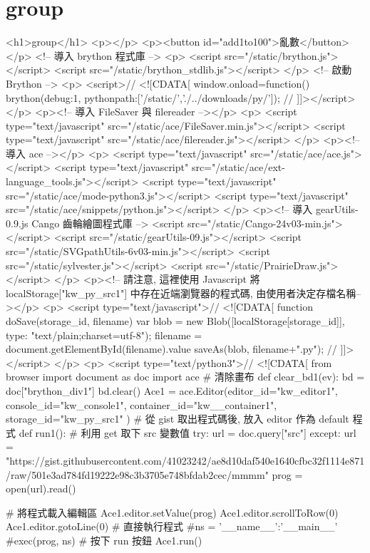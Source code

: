 \chapter{group}
<h1>group</h1>
<p></p>
<p><button id="add1to100">亂數</button></p>
<!-- 導入 brython 程式庫 -->
<p>
<script src="/static/brython.js"></script>
<script src="/static/brython_stdlib.js"></script>
</p>
<!-- 啟動 Brython -->
<p>
<script>// <![CDATA[
window.onload=function(){
brython({debug:1, pythonpath:['/static/','./../downloads/py/']});
}
// ]]></script>
</p>
<p><!-- 導入 FileSaver 與 filereader --></p>
<p>
<script type="text/javascript" src="/static/ace/FileSaver.min.js"></script>
<script type="text/javascript" src="/static/ace/filereader.js"></script>
</p>
<p><!-- 導入 ace --></p>
<p>
<script type="text/javascript" src="/static/ace/ace.js"></script>
<script type="text/javascript" src="/static/ace/ext-language_tools.js"></script>
<script type="text/javascript" src="/static/ace/mode-python3.js"></script>
<script type="text/javascript" src="/static/ace/snippets/python.js"></script>
</p>
<p><!-- 導入 gearUtils-0.9.js Cango 齒輪繪圖程式庫 -->
<script src="/static/Cango-24v03-min.js"></script>
<script src="/static/gearUtils-09.js"></script>
<script src="/static/SVGpathUtils-6v03-min.js"></script>
<script src="/static/sylvester.js"></script>
<script src="/static/PrairieDraw.js"></script>
</p>
<p><!-- 請注意, 這裡使用 Javascript 將 localStorage["kw_py_src1"] 中存在近端瀏覽器的程式碼, 由使用者決定存檔名稱--></p>
<p>
<script type="text/javascript">// <![CDATA[
function doSave(storage_id, filename){
    var blob = new Blob([localStorage[storage_id]], {type: "text/plain;charset=utf-8"});
    filename = document.getElementById(filename).value
    saveAs(blob, filename+".py");
}
// ]]></script>
</p>
<p>
<script type="text/python3">// <![CDATA[
from browser import document as doc
import ace
# 清除畫布
def clear_bd1(ev):
    bd = doc["brython_div1"]
    bd.clear()
Ace1 = ace.Editor(editor_id="kw_editor1", console_id="kw_console1", container_id="kw__container1", storage_id="kw_py_src1" )
# 從 gist 取出程式碼後, 放入 editor 作為 default 程式
def run1():
    # 利用 get 取下 src 變數值
    try:
        url = doc.query["src"]
    except:
        url = "https://gist.githubusercontent.com/41023242/ae8d10daf540e1640cfbc32f1114e871/raw/501e3ad784fd19222e98c3b3705e748bfdab2cec/mmmm"
    prog = open(url).read()

    # 將程式載入編輯區
    Ace1.editor.setValue(prog)
    Ace1.editor.scrollToRow(0)
    Ace1.editor.gotoLine(0)
    # 直接執行程式
    #ns = {'__name__':'__main__'}
    #exec(prog, ns)
    # 按下 run 按鈕
    Ace1.run()

